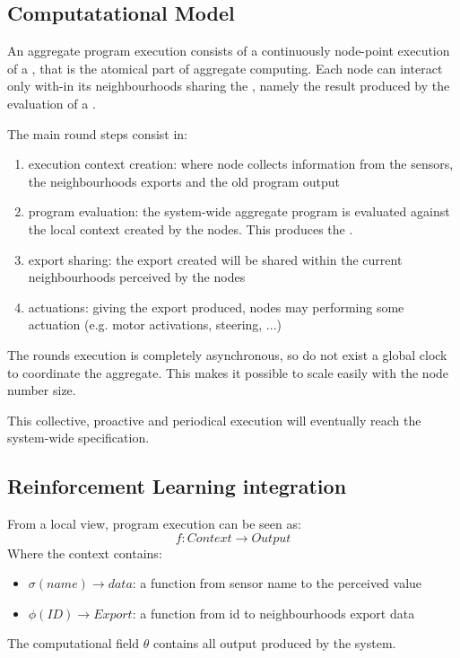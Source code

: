 \documentclass[
  twocolumn,
]{ceurart}
\begin{document}
\subsection{Computatational Model}
An aggregate program execution consists of a continuously node-point execution of a \round{}, 
 that is the atomical part of aggregate computing.
%
Each node can interact only with-in its neighbourhoods sharing the \export{}, 
 namely the result produced by the evaluation of a \round{}.

The main round steps consist in:
\begin{enumerate}
  \item execution context creation: where node collects information from the sensors, the neighbourhoods exports and the old
  program output
  \item program evaluation: the system-wide aggregate program is evaluated against the local context created by the nodes. 
  This produces the \export{}.
  \item export sharing: the export created will be shared within the current neighbourhoods perceived by the nodes
  \item actuations: giving the export produced, nodes may performing some actuation (e.g. motor activations, steering, ...)
\end{enumerate}

The rounds execution is completely asynchronous, so do not exist a global clock to coordinate the aggregate. 
 This makes it possible to scale easily with the node number size.

This collective, proactive and periodical execution will eventually reach the system-wide specification.

\subsection{Reinforcement Learning integration}
From a local view, program execution can be seen as:
$$
f : \textit{Context} \rightarrow \textit{Output}
$$
Where the context contains:
\begin{itemize}
  \item $\sigma(name) \rightarrow \textit{data}$: a function from sensor name to the perceived value
  \item $\phi(\textit{ID}) \rightarrow \textit{Export}$: a function from id to neighbourhoods export data
\end{itemize}
The computational field $\theta$ contains all output produced by the system.
\end{document}
